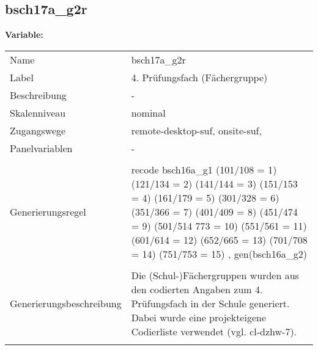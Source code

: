 	
	
	\subsection{bsch17a\_g2r}
	\label{subSection:bsch17a_g2r}

	\noindent\textbf{Variable:}\\
		\begin{tabular}{lL{11.3cm}}
			\label{tableVariable:bsch17a_g2r}
			Name & bsch17a\_g2r \\
			Label & 4. Prüfungsfach  (Fächergruppe) \\
			Beschreibung & - \\
			Skalenniveau & nominal \\
			Zugangswege &
				remote-desktop-suf,
				onsite-suf,
 \\
			Panelvariablen & -
			 \\
			 \\
					Generierungsregel & recode bsch16a\_g1 (101/108 = 1) (121/134 = 2) (141/144 = 3) 
(151/153 = 4) (161/179 = 5) (301/328 = 6) (351/366 = 7) 
(401/409 = 8) (451/474 = 9) (501/514 773 = 10) (551/561 = 11) 
(601/614 = 12) (652/665 = 13) (701/708 = 14) (751/753 = 15)
, gen(bsch16a\_g2) \\
				 \\
					Generierungsbeschreibung & Die (Schul-)Fächergruppen wurden aus den codierten Angaben zum 4. Prüfungsfach in der Schule generiert. Dabei wurde eine projekteigene Codierliste verwendet (vgl. cl-dzhw-7).
				 \\	
			 \\
		\end{tabular}






